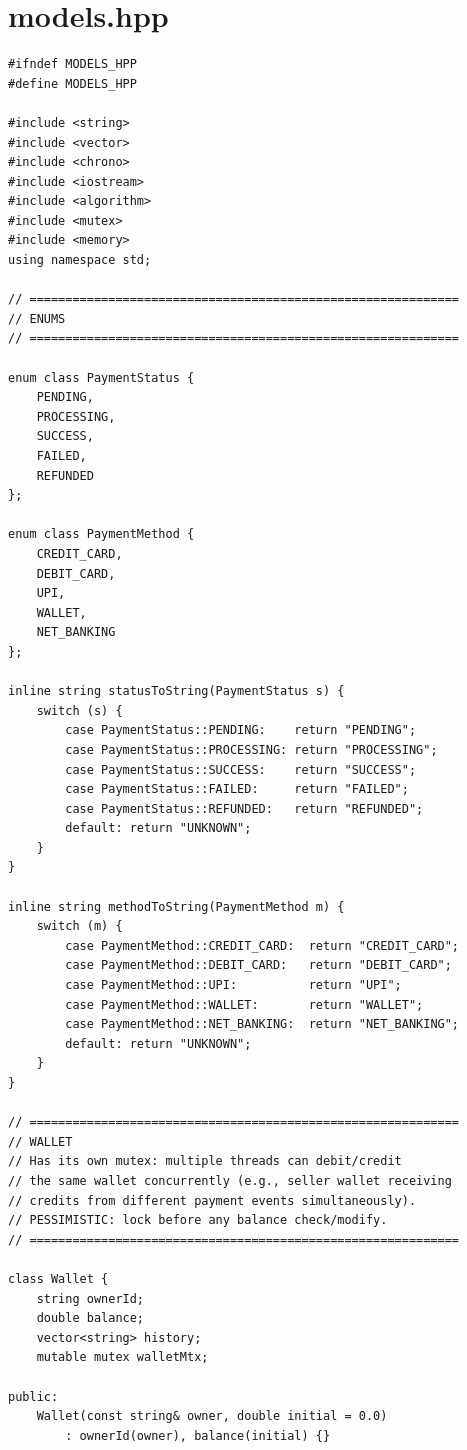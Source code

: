\documentclass[11pt,a4paper]{article}
\begin{document}
\section{models.hpp}
\begin{lstlisting}[title={\texttt{models.hpp}}]
#ifndef MODELS_HPP
#define MODELS_HPP

#include <string>
#include <vector>
#include <chrono>
#include <iostream>
#include <algorithm>
#include <mutex>
#include <memory>
using namespace std;

// ============================================================
// ENUMS
// ============================================================

enum class PaymentStatus {
    PENDING,
    PROCESSING,
    SUCCESS,
    FAILED,
    REFUNDED
};

enum class PaymentMethod {
    CREDIT_CARD,
    DEBIT_CARD,
    UPI,
    WALLET,
    NET_BANKING
};

inline string statusToString(PaymentStatus s) {
    switch (s) {
        case PaymentStatus::PENDING:    return "PENDING";
        case PaymentStatus::PROCESSING: return "PROCESSING";
        case PaymentStatus::SUCCESS:    return "SUCCESS";
        case PaymentStatus::FAILED:     return "FAILED";
        case PaymentStatus::REFUNDED:   return "REFUNDED";
        default: return "UNKNOWN";
    }
}

inline string methodToString(PaymentMethod m) {
    switch (m) {
        case PaymentMethod::CREDIT_CARD:  return "CREDIT_CARD";
        case PaymentMethod::DEBIT_CARD:   return "DEBIT_CARD";
        case PaymentMethod::UPI:          return "UPI";
        case PaymentMethod::WALLET:       return "WALLET";
        case PaymentMethod::NET_BANKING:  return "NET_BANKING";
        default: return "UNKNOWN";
    }
}

// ============================================================
// WALLET
// Has its own mutex: multiple threads can debit/credit
// the same wallet concurrently (e.g., seller wallet receiving
// credits from different payment events simultaneously).
// PESSIMISTIC: lock before any balance check/modify.
// ============================================================

class Wallet {
    string ownerId;
    double balance;
    vector<string> history;
    mutable mutex walletMtx;

public:
    Wallet(const string& owner, double initial = 0.0)
        : ownerId(owner), balance(initial) {}


\end{lstlisting}
\end{document}
